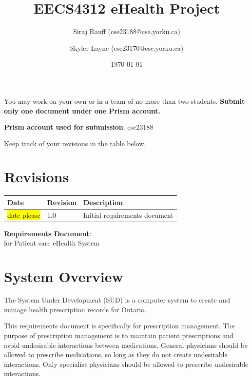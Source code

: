 \documentclass[fontsize=12pt,paper=letter,twoside]{scrartcl}
\title{EECS4312 eHealth Project}
\author{{Siraj Rauff (cse23188@cse.yorku.ca)}
\and {Skyler Layne (cse23170@cse.yorku.ca)}
}
\date{\today} %
\begin{document}
\maketitle

\noindent You may work on your own or in a team of no more than two students. \textbf{Submit only one document under one Prism account.} 

\bigskip
\noindent \textbf{Prism account used for submission}: cse23188

\bigskip\noindent
Keep track of your revisions in the table below.

\section*{Revisions}
\begin{tabular}{|l|l|p{3in}|}
\hline
Date & Revision& Description \\ 
\hline

\hl{date please}

& 1.0       
& Initial requirements document\\ 
\hline
\end{tabular}

\newpage

\vspace*{2in}
\begin{center}
\huge{\textbf{Requirements Document}:\\ for Patient care eHealth System}
\end{center}

\newpage

\tableofcontents
\listoffigures
\listoftables
\newpage


\section{System Overview}

The System Under Development (SUD) is a computer system to create and manage health prescription records for Ontario.

This requirements document is specifically for prescription management. 
The purpose of prescription management is to maintain patient prescriptions and avoid undesirable interactions between medications. 
General physicians should be allowed to prescribe medications, so long as they do not create undesirable interactions.
Only specialist physicians should be allowed to prescribe undesirable interactions. 
\end{document}
